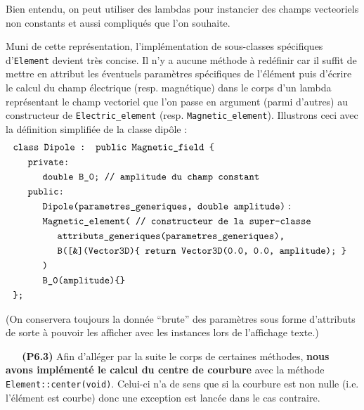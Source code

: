 \documentclass[12pt, letterpaper, twoside]{article}
\newcommand{\T}[1]{\texttt{#1}}
\begin{document}
\noindent Bien entendu, on peut utiliser des lambdas pour instancier des champs vecteoriels non constants et aussi compliqués que l'on souhaite.

Muni de cette représentation, l'implémentation de sous-classes spécifiques d'\T{Element} devient très concise. Il n'y a aucune méthode à redéfinir car il suffit de mettre en attribut les éventuels paramètres spécifiques de l'élément puis d'écrire le calcul du champ électrique (resp. magnétique) dans le corps d'un lambda représentant le champ vectoriel que l'on passe en argument (parmi d'autres) au constructeur de \T{Electric\_element} (resp. \T{Magnetic\_element}). Illustrons ceci avec la définition simplifiée de la classe dipôle :
\begin{align*}
	&\T{class Dipole : public Magnetic\_field \{}\\
	&\indent \T{private:}\\
	& \indent \indent \T{double B\_0; // amplitude du champ constant}\\
	&\indent \T{public:}\\
	& \indent \indent \T{Dipole(parametres\_generiques, double amplitude)} :\\
	& \indent \indent \T{Magnetic\_element( // constructeur de la super-classe}\\
	& \indent \indent \indent \T{attributs\_generiques(parametres\_generiques),}\\
	& \indent \indent \indent \T{B([\&](Vector3D)\{ return Vector3D(0.0, 0.0, amplitude); \} }\\
	& \indent \indent \T{)}\\
	& \indent \indent \T{B\_0(amplitude)\{\}}\\
	& \T{\};}
\end{align*}

\noindent (On conservera toujours la donnée ``brute'' des paramètres sous forme d'attributs de sorte à pouvoir les afficher avec les instances lors de l'affichage texte.)

\ \linebreak
\ \linebreak
\textbf{(P6.3)} Afin d'alléger par la suite le corps de certaines méthodes, \textbf{nous avons implémenté le calcul du centre de courbure} avec la méthode \T{Element::center(void)}. Celui-ci n'a de sens que si la courbure est non nulle (i.e. l'élément est courbe) donc une exception est lancée dans le cas contraire.
\end{document}
